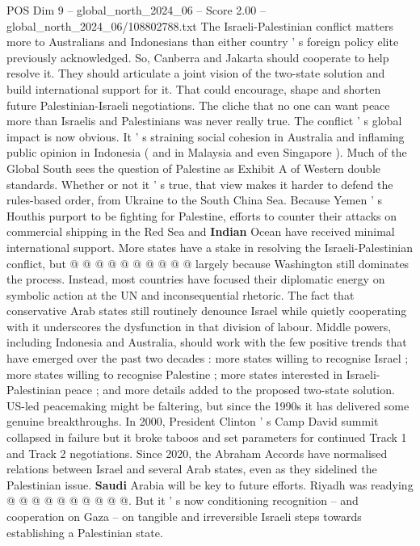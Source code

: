 \begin{textsample}{POS Dim 9 – global\_north\_2024\_06 – Score 2.00 – global\_north\_2024\_06/108802788.txt}  \label{ex:f9_pos_277}
The Israeli-Palestinian conflict matters more to Australians and Indonesians than either country ' s foreign policy elite previously acknowledged.
So, Canberra and Jakarta should cooperate to help resolve it.
They should articulate a joint vision of the two-state solution and build international support for it.
That could encourage, shape and shorten future Palestinian-Israeli negotiations.
The cliche that no one can want peace more than Israelis and Palestinians was never really true.
The conflict ' s global impact is now obvious.
It ' s straining social cohesion in Australia and inflaming public opinion in Indonesia ( and in Malaysia and even Singapore ).
Much of the Global South sees the question of Palestine as Exhibit A of Western double standards.
Whether or not it ' s true, that view makes it harder to defend the rules-based order, from Ukraine to the South China Sea.
Because Yemen ' s Houthis purport to be fighting for Palestine, efforts to counter their attacks on commercial shipping in the Red Sea and \textbf{Indian} Ocean have received minimal international support.
More states have a stake in resolving the Israeli-Palestinian conflict, but @ @ @ @ @ @ @ @ @ @ largely because Washington still dominates the process.
Instead, most countries have focused their diplomatic energy on symbolic action at the UN and inconsequential rhetoric.
The fact that conservative Arab states still routinely denounce Israel while quietly cooperating with it underscores the dysfunction in that division of labour.
Middle powers, including Indonesia and Australia, should work with the few positive trends that have emerged over the past two decades : more states willing to recognise Israel ; more states willing to recognise Palestine ; more states interested in Israeli-Palestinian peace ; and more details added to the proposed two-state solution.
US-led peacemaking might be faltering, but since the 1990s it has delivered some genuine breakthroughs.
In 2000, President Clinton ' s Camp David summit collapsed in failure but it broke taboos and set parameters for continued Track 1 and Track 2 negotiations.
Since 2020, the Abraham Accords have normalised relations between Israel and several Arab states, even as they sidelined the Palestinian issue. \textbf{Saudi} Arabia will be key to future efforts.
Riyadh was readying @ @ @ @ @ @ @ @ @ @.
But it ' s now conditioning recognition -- and cooperation on Gaza -- on tangible and irreversible Israeli steps towards establishing a Palestinian state.

\end{textsample}
